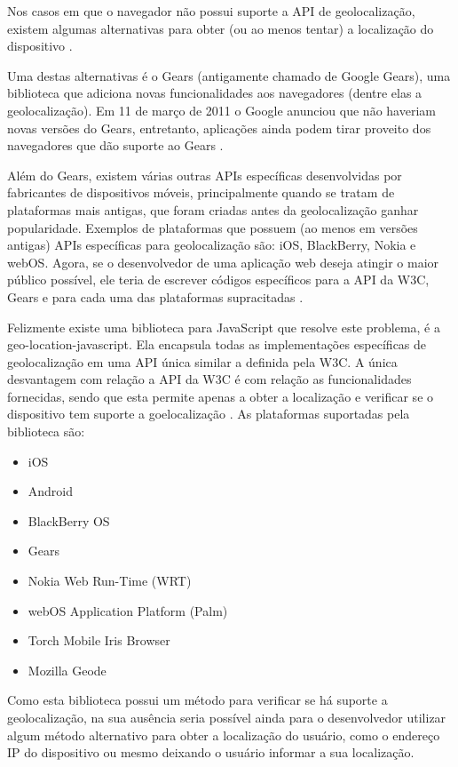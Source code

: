\documentclass[diss]{template/setrem}
\begin{document}
Nos casos em que o navegador não possui suporte a API de geolocalização, existem algumas alternativas para obter (ou ao menos tentar) a localização do dispositivo \citep{Holdener2011}.

Uma destas alternativas é o Gears (antigamente chamado de Google Gears), uma biblioteca que adiciona novas funcionalidades aos navegadores (dentre elas a geolocalização). Em 11 de março de 2011 o Google anunciou que não haveriam novas versões do Gears, entretanto, aplicações ainda podem tirar proveito dos navegadores que dão suporte ao Gears \citep{Holdener2011}.

Além do Gears, existem várias outras APIs específicas desenvolvidas por fabricantes de dispositivos móveis, principalmente quando se tratam de plataformas mais antigas, que foram criadas antes da geolocalização ganhar popularidade. Exemplos de plataformas que possuem (ao menos em versões antigas) APIs específicas para geolocalização são: iOS, BlackBerry, Nokia e webOS. Agora, se o desenvolvedor de uma aplicação web deseja atingir o maior público possível, ele teria de escrever códigos específicos para a API da W3C, Gears e para cada uma das plataformas supracitadas \citep{Holdener2011}.

Felizmente existe uma biblioteca para JavaScript que resolve este problema, é a geo-location-javascript. Ela encapsula todas as implementações específicas de geolocalização em uma API única similar a definida pela W3C. A única desvantagem com relação a API da W3C é com relação as funcionalidades fornecidas, sendo que esta permite apenas a obter a localização e verificar se o dispositivo tem suporte a goelocalização \citep{Holdener2011}. As plataformas suportadas pela biblioteca são:

\begin{itemize}
   	\item iOS
   	\item Android
   	\item BlackBerry OS
   	\item Gears
   	\item Nokia Web Run-Time (WRT)
   	\item webOS Application Platform (Palm)
   	\item Torch Mobile Iris Browser
   	\item Mozilla Geode
\end{itemize}

Como esta biblioteca possui um método para verificar se há suporte a geolocalização, na sua ausência seria possível ainda para o desenvolvedor utilizar algum método alternativo para obter a localização do usuário, como o endereço IP do dispositivo ou mesmo deixando o usuário informar a sua localização.
\end{document}
